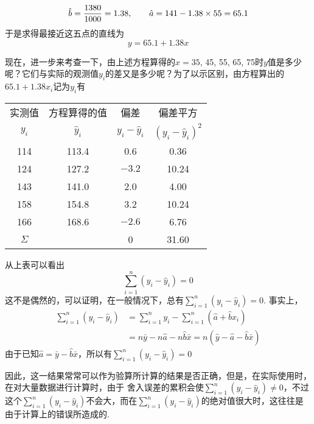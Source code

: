 \[\hat b=\dfrac{1380}{1000}=1.38,\qquad \hat a=141-1.38\times 55=65.1\]
于是求得最接近这五点的直线为
\[y=65.1+1.38x\]

现在，进一步来考查一下，由上述方程算得的$x=35$, 45, 55, 65, 75时$y$值是多少呢？它们与实际的观测值$y_i$的差又是多少呢？为了以示区别，由方程算出的$65.1+1.38x_i$记为$y_i$有

\begin{center}
\begin{tabular}{cccc}
\hline
实测值&方程算得的值& 偏差& 偏差平方\\
$y_i$&$\hat y_i$&$y_i-\hat y_i$&$\left(y_i-\hat y_i\right)^2$\\
\hline
114&113.4&0.6&0.36\\
124&127.2&$-3.2$&10.24\\
143&141.0&2.0&4.00\\
158&154.8&3.2&10.24\\
166&168.6&$-2.6$&6.76\\
\hline
$\Sigma$&&0&31.60\\
\hline
\end{tabular}
\end{center}

从上表可以看出
\[\sum^n_{i=1}\left(y_i-\hat y_i\right)=0\]
这不是偶然的，可以证明，在一般情况下，总有$\sum\limits^n_{i=1}\left(y_i-\hat y_i\right)=0$. 事实上，
\[\begin{split}
\sum^n_{i=1}\left(y_i-\hat y_i\right)&=\sum^n_{i=1}y_i-\sum^n_{i=1}\left(\hat a+\hat b x_i\right)    \\
&=n\bar y -n\hat a-n\hat b \bar x=n\left(\hat y-\hat a-\hat b \bar x\right)
\end{split} \]
由于已知$\hat a=\bar y-\hat b\bar x$，所以有$\sum\limits^n_{i=1}\left(y_i-\hat y_i\right)=0$


因此，这一结果常常可以作为验算所计算的结果是否正确，但是，在实际使用时，在对大量数据进行计算时，由于
舍入误差的累积会使$\sum\limits^n_{i=1}\left(y_i-\hat y_i\right)\ne 0$，不过这个$\sum\limits^n_{i=1}\left(y_i-\hat y_i\right)$不会大，而在$\sum\limits^n_{i=1}\left(y_i-\hat y_i\right)$的绝对值很大时，这往往是由于计算上的错误所造成的.


